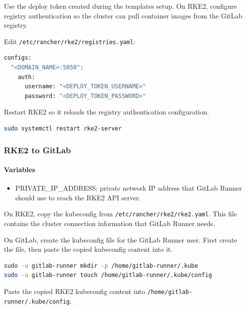 \documentclass{article}
\begin{document}
Use the deploy token created during the templates setup. On RKE2, configure registry authentication so the cluster can pull container images from the GitLab registry.

\vspace{0.5cm}

Edit \texttt{/etc/rancher/rke2/registries.yaml}:
\begin{lstlisting}[language=sh]
configs:
  "<DOMAIN_NAME>:5050":
    auth:
      username: "<DEPLOY_TOKEN_USERNAME>"
      password: "<DEPLOY_TOKEN_PASSWORD>"
\end{lstlisting}

Restart RKE2 so it reloads the registry authentication configuration.

\begin{lstlisting}[language=sh]
sudo systemctl restart rke2-server
\end{lstlisting}

\vspace{0.4cm}
\subsubsection{RKE2 to GitLab}

\paragraph{Variables}
\begin{itemize}
	\item PRIVATE\_IP\_ADDRESS: private network IP address that GitLab Runner should use to reach the RKE2 API server.
\end{itemize}

On RKE2, copy the kubeconfig from \texttt{/etc/rancher/rke2/rke2.yaml}. This file contains the cluster connection information that GitLab Runner needs.

\vspace{0.5cm}

On GitLab, create the kubeconfig file for the GitLab Runner user. First create the file, then paste the copied kubeconfig content into it.
\begin{lstlisting}[language=sh]
sudo -u gitlab-runner mkdir -p /home/gitlab-runner/.kube
sudo -u gitlab-runner touch /home/gitlab-runner/.kube/config
\end{lstlisting}

Paste the copied RKE2 kubeconfig content into \texttt{/home/gitlab-runner/.kube/config}.

\vspace{0.5cm}
\end{document}
